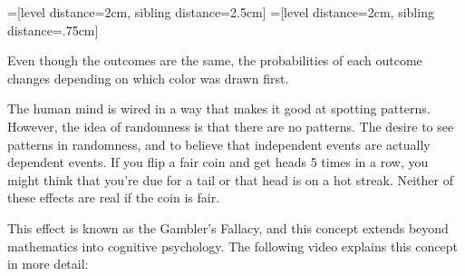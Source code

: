 \documentclass{ximera}
\begin{document}
\begin{center}

=[level distance=2cm, sibling distance=2.5cm]
=[level distance=2cm, sibling distance=.75cm]

\end{center}

Even though the outcomes are the same, the probabilities of each outcome changes depending on which color was drawn first.

The human mind is wired in a way that makes it good at spotting patterns. However, the idea of randomness is that there are no patterns. The desire to see patterns in randomness, and to believe that independent events are actually dependent events. If you flip a fair coin and get heads 5 times in a row, you might think that you're due for a tail or that head is on a hot streak. Neither of these effects are real if the coin is fair.

This effect is known as the Gambler's Fallacy, and this concept extends beyond mathematics into cognitive psychology. The following video explains this concept in more detail: 
\end{document}
